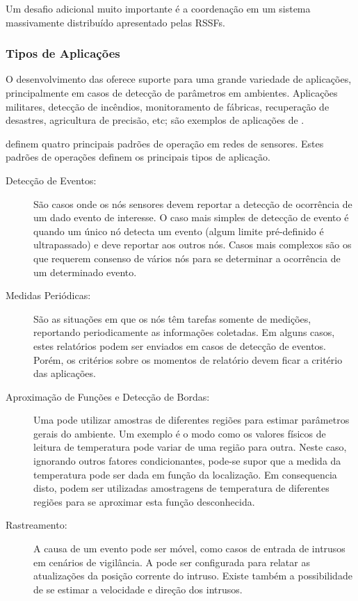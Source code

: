 Um desafio adicional muito importante é a coordenação em um sistema massivamente distribuído apresentado pelas RSSFs.

\subsubsection{Tipos de Aplicações}
O desenvolvimento das \rssfs oferece suporte para uma grande variedade de aplicações, principalmente em casos de detecção de parâmetros em ambientes. Aplicações militares, detecção de incêndios, monitoramento de fábricas, recuperação de desastres, agricultura de precisão, etc; são exemplos de aplicações de \rssfs.

\cite{Holger2005} definem quatro principais padrões de operação em redes de sensores. Estes padrões de operações definem os principais tipos de aplicação.

\begin{description}

\item[Detecção de Eventos:] São casos onde os nós sensores devem reportar a detecção de ocorrência de um dado evento de interesse. O caso mais simples de detecção de evento é quando um único nó detecta um evento (algum limite pré-definido é ultrapassado) e deve reportar aos outros nós. Casos mais complexos são os que requerem consenso de vários nós para se determinar a ocorrência de um determinado evento.

\item[Medidas Periódicas: ] São as situações em que os nós têm tarefas somente de medições, reportando periodicamente as informações coletadas. Em alguns casos, estes relatórios podem ser enviados em casos de detecção de eventos. Porém, os critérios sobre os momentos de relatório devem ficar a critério das aplicações.

\item[Aproximação de Funções e Detecção de Bordas:] Uma \rssf pode utilizar amostras de diferentes regiões para estimar parâmetros gerais do ambiente. Um exemplo é o modo como os valores físicos de leitura de temperatura pode variar de uma região para outra. Neste caso, ignorando outros fatores condicionantes, pode-se supor que a medida da temperatura pode ser dada em função da localização. Em consequencia disto, podem ser utilizadas amostragens de temperatura de diferentes regiões para se aproximar esta função desconhecida.

\item[Rastreamento:] A causa de um evento pode ser móvel, como casos de entrada de intrusos em cenários de vigilância. A \rssf pode ser configurada para relatar as atualizações da posição corrente do intruso. Existe também a possibilidade de se estimar a velocidade e direção dos intrusos. 

\end{description}


